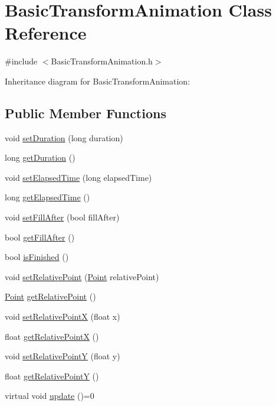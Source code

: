 \hypertarget{class_basic_transform_animation}{}\section{Basic\+Transform\+Animation Class Reference}
\label{class_basic_transform_animation}


{\ttfamily \#include $<$Basic\+Transform\+Animation.\+h$>$}



Inheritance diagram for Basic\+Transform\+Animation\+:
\subsection*{Public Member Functions}
\begin{DoxyCompactItemize}
\item 
void \hyperlink{class_basic_transform_animation_a12cbbe1de97f1bc06e3bdf25c9a46045}{set\+Duration} (long duration)
\item 
long \hyperlink{class_basic_transform_animation_a57c871bf0044ce70872d2fbd12f3317a}{get\+Duration} ()
\item 
void \hyperlink{class_basic_transform_animation_a256fc4440ecd8b14155749df966cdfb0}{set\+Elapsed\+Time} (long elapsed\+Time)
\item 
long \hyperlink{class_basic_transform_animation_a7ddb2882c528e4fb3840a3613c8cfd9a}{get\+Elapsed\+Time} ()
\item 
void \hyperlink{class_basic_transform_animation_abb0b8ba9c165d6ac95415c4d61f73fe6}{set\+Fill\+After} (bool fill\+After)
\item 
bool \hyperlink{class_basic_transform_animation_a5c4ce9cc0d4beb70a3f6f13ec37ca6e5}{get\+Fill\+After} ()
\item 
bool \hyperlink{class_basic_transform_animation_a20e1dc6f82c86a9153445d786d14c418}{is\+Finished} ()
\item 
void \hyperlink{class_basic_transform_animation_a01888bebf388f05201c5dda18c24d4ef}{set\+Relative\+Point} (\hyperlink{class_point}{Point} relative\+Point)
\item 
\hyperlink{class_point}{Point} \hyperlink{class_basic_transform_animation_a69dc2238c5a86960e017a81e944ec591}{get\+Relative\+Point} ()
\item 
void \hyperlink{class_basic_transform_animation_a3989a6b289f60dd868c64f3e9ea8f9a5}{set\+Relative\+Point\+X} (float x)
\item 
float \hyperlink{class_basic_transform_animation_afdd12616f28afea6332ebb90bc3fe47a}{get\+Relative\+Point\+X} ()
\item 
void \hyperlink{class_basic_transform_animation_afa794d26d807dea36573ccb8accd7029}{set\+Relative\+Point\+Y} (float y)
\item 
float \hyperlink{class_basic_transform_animation_ab4717d34671f3f59a18120c14cbdb5d3}{get\+Relative\+Point\+Y} ()
\item 
virtual void \hyperlink{class_basic_transform_animation_aeeb48c45423783d9dd657441b40c2569}{update} ()=0
\end{DoxyCompactItemize}
